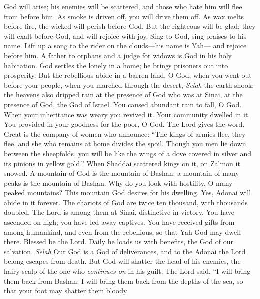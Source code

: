 \begin{biblechapter} %
 God will arise; his enemies will be scattered, 
and those who hate him will flee from before him.
\verse As smoke is driven off, you will drive them off. 
As wax melts before fire, 
the wicked will perish before God.
\verse But the righteous will be glad; they will exalt before God, 
and will rejoice with joy.
\verse Sing to God, sing praises to his name. 
Lift up a song to the rider on the clouds—his name is Yah— 
and rejoice before him.
\verse A father to orphans and a judge for widows 
is God in his holy habitation.
\verse God settles the lonely in a home; 
he brings prisoners out into prosperity. 
But the rebellious abide in a barren land.
\verse O God, when you went out before your people, 
when you marched through the desert, \textit{Selah}
\verse the earth shook; the heavens also dripped rain 
at the presence of God who was at Sinai, 
at the presence of God, the God of Israel.
\verse You caused abundant rain to fall, O God. 
When your inheritance was weary you revived it.
\verse Your community dwelled in it. 
You provided in your goodness for the poor, O God.
\verse The Lord gives the word. 
Great is the company of women who announce:
\verse “The kings of armies flee, they flee, 
and she who remains at home divides the spoil.
\verse Though you men lie down between the sheepfolds, 
you will be like the wings of a dove covered in silver 
and its pinions in yellow gold.”
\verse When Shaddai scattered kings on it, 
on Zalmon it snowed.
\verse A mountain of God is the mountain of Bashan; 
a mountain of many peaks is the mountain of Bashan.
\verse Why do you look with hostility, O many-peaked mountains? 
This mountain God desires for his dwelling. 
Yes, Adonai will abide in it forever.
\verse The chariots of God 
are twice ten thousand, with thousands doubled. 
The Lord is among them at Sinai, distinctive in victory.
\verse You have ascended on high; you have led away captives. 
You have received gifts from among humankind, 
and even from the rebellious, so that Yah God may dwell there.
\verse Blessed be the Lord. Daily he loads us with benefits, 
the God of our salvation. \textit{Selah}
\verse Our God is a God of deliverances, 
and to the Adonai the Lord belong escapes from death.
\verse But God will shatter the head of his enemies, 
the hairy scalp of the one who \textit{continues on} in his guilt.
\verse The Lord said, “I will bring them back from Bashan; 
I will bring them back from the depths of the sea,
\verse so that your foot may shatter them bloody 

\end{biblechapter}
